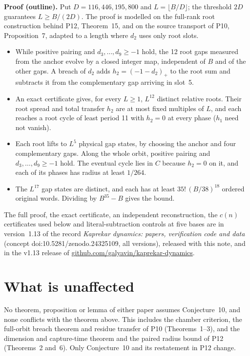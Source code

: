 \documentclass[11pt]{amsart}
\begin{document}
\medskip\noindent\textbf{Proof (outline).} Put \(D=116{,}446{,}195{,}800\) and \(L=\lfloor B/D\rfloor\); the threshold \(2D\) guarantees \(L\ge B/(2D)\). The proof is modelled on the full-rank root construction behind P12, Theorem~15, and on the source transport of P10, Proposition~7, adapted to a length where \(d_2\) uses only root slots.
\begin{itemize}
\item While positive pairing and \(d_3,\ldots,d_9\ge-1\) hold, the 12 root gaps measured from the anchor evolve by a closed integer map, independent of \(B\) and of the other gaps. A breach of \(d_2\) adds \(h_2=(-1-d_2)_+\) to the root sum and subtracts it from the complementary gap arriving in slot~5.
\item An exact certificate gives, for every \(L\ge1\), \(L^{12}\) distinct relative roots. Their root spread and total transfer \(h_2\) are at most fixed multiples of \(L\), and each reaches a root cycle of least period 11 with \(h_2=0\) at every phase (\(h_1\) need not vanish).
\item Each root lifts to \(L^5\) physical gap states, by choosing the anchor and four complementary gaps. Along the whole orbit, positive pairing and \(d_3,\ldots,d_9\ge-1\) hold. The eventual cycle lies in \(C\) because \(h_2=0\) on it, and each of its phases has radius at least \(1/264\).
\item The \(L^{17}\) gap states are distinct, and each has at least \(35!\,(B/38)^{18}\) ordered original words. Dividing by \(B^{35}-B\) gives the bound.
\end{itemize}
The full proof, the exact certificate, an independent reconstruction, the \(c(n)\) certificates used below and literal-subtraction controls at five bases are in version~1.13 of the record \emph{Kaprekar dynamics: papers, verification code and data} (concept doi:10.5281/zenodo.24325109, all versions), released with this note, and in the v1.13 release of \href{https://github.com/galyavin/kaprekar-dynamics}{github.com/galyavin/kaprekar-dynamics}.

\section*{What is unaffected}
No theorem, proposition or lemma of either paper assumes Conjecture~10, and none conflicts with the theorem above. This includes the chamber criterion, the full-orbit breach theorem and residue transfer of P10 (Theorems~1--3), and the dimension and capture-time theorem and the paired radius bound of P12 (Theorems~2 and~6). Only Conjecture~10 and its restatement in P12 change.
\end{document}
